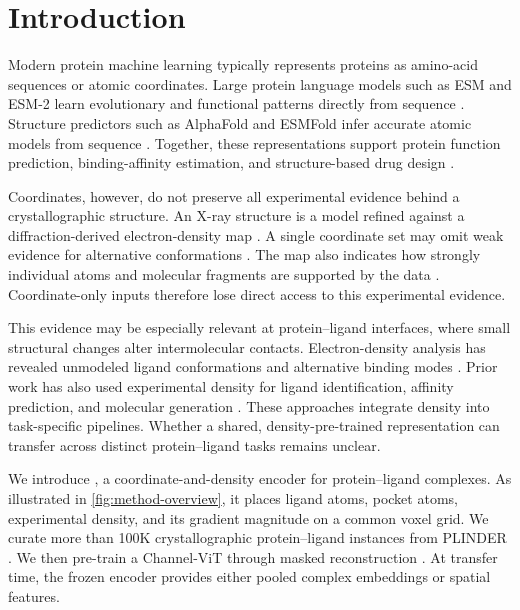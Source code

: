 
\section{Introduction}
\label{sec:intro}

Modern protein machine learning typically represents proteins as amino-acid
sequences or atomic coordinates. Large protein language models such as ESM and
ESM-2 learn evolutionary and functional patterns directly from sequence
\citep{rives2021biological,lin2023evolutionary}. Structure predictors such as
AlphaFold and ESMFold infer accurate atomic models from sequence
\citep{jumper2021highly,lin2023evolutionary,abramson2024accurate}. Together,
these representations support protein function prediction, binding-affinity
estimation, and structure-based drug design
\citep{radivojac2013large,ozturk2018deepdta,pinheiro2024structure}.

Coordinates, however, do not preserve all experimental evidence behind a
crystallographic structure. An X-ray structure is a model refined against a
diffraction-derived electron-density map \citep{adams2011phenix}. A single
coordinate set may omit weak evidence for alternative conformations
\citep{lang2010automated,lang2014protein}. The map also indicates how strongly
individual atoms and molecular fragments are supported by the data
\citep{meyder2017estimating}. Coordinate-only inputs therefore lose direct
access to this experimental evidence.

This evidence may be especially relevant at protein--ligand interfaces, where
small structural changes alter intermolecular contacts. Electron-density
analysis has revealed unmodeled ligand conformations and alternative binding
modes \citep{van2018qfit}. Prior work has also used experimental density for
ligand identification, affinity prediction, and molecular generation
\citep{kowiel2019automatic,suriana2025beyond,wang2022pocket}. These approaches
integrate density into task-specific pipelines. Whether a shared,
density-pre-trained representation can transfer across distinct
protein--ligand tasks remains unclear.

We introduce \ours{}, a coordinate-and-density encoder for protein--ligand
complexes. As illustrated in \cref{fig:method-overview}, it places ligand atoms,
pocket atoms, experimental density, and its gradient magnitude on a common
voxel grid. We curate more than 100K crystallographic protein--ligand instances
from PLINDER \citep{durairaj2024plinder}. We then pre-train a Channel-ViT through
masked reconstruction \citep{bao2023channel-24a,he2022masked}. At transfer time,
the frozen encoder provides either pooled complex embeddings or spatial
features.

